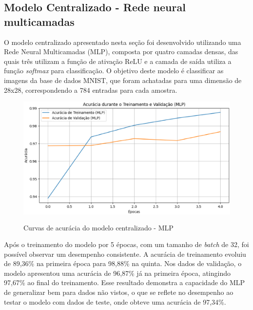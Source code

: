 \subsection{Modelo Centralizado - Rede neural multicamadas}

O modelo centralizado apresentado nesta seção foi desenvolvido utilizando uma Rede Neural Multicamadas (MLP), composta por quatro camadas densas, das quais três utilizam a função de ativação ReLU e a camada de saída utiliza a função \textit{softmax} para classificação. O objetivo deste modelo é classificar as imagens da base de dados MNIST, que foram achatadas para uma dimensão de 28x28, correspondendo a 784 entradas para cada amostra.

\begin{figure}[ht]
    \centering
    \caption{Curvas de acurácia do modelo centralizado - MLP}
    \includegraphics[scale=0.4]{figuras/analiseResultados/acuracyMLP.eps}
    \label{fig:acuracyMLP}
\end{figure}

Após o treinamento do modelo por 5 épocas, com um tamanho de \textit{batch} de 32, foi possível observar um desempenho consistente. A acurácia de treinamento evoluiu de 89,36\% na primeira época para 98,88\% na quinta. Nos dados de validação, o modelo apresentou uma acurácia de 96,87\% já na primeira época, atingindo 97,67\% ao final do treinamento. Esse resultado demonstra a capacidade do MLP de generalizar bem para dados não vistos, o que se reflete no desempenho ao testar o modelo com dados de teste, onde obteve uma acurácia de 97,34\%.

